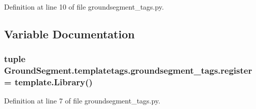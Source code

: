Definition at line 10 of file groundsegment\+\_\+tags.\+py.



\subsection{Variable Documentation}
\hypertarget{namespace_ground_segment_1_1templatetags_1_1groundsegment__tags_a9d535c89941e5aa63499e80d24eec0b8}{}
\subsubsection[{register}]{\setlength{\rightskip}{0pt plus 5cm}tuple Ground\+Segment.\+templatetags.\+groundsegment\+\_\+tags.\+register = template.\+Library()}\label{namespace_ground_segment_1_1templatetags_1_1groundsegment__tags_a9d535c89941e5aa63499e80d24eec0b8}


Definition at line 7 of file groundsegment\+\_\+tags.\+py.

